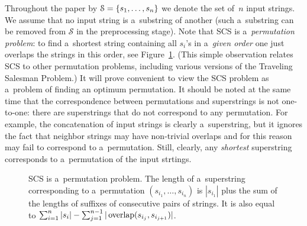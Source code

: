 Throughout the paper by ${\cal S}=\{s_1, \dots, s_n\}$ we denote
the set of~$n$ input strings. We assume that no input string is a~substring of another (such a~substring can be removed from $\mathcal{S}$ in the preprocessing stage). Note that SCS is a~{\em permutation problem}: to find a~shortest string containing all $s_i$'s in a~{\em given order} one just
overlaps the strings in this order, see Figure~\ref{fig:permutation}. (This simple observation relates SCS to other permutation problems, including various versions of the Traveling Salesman Problem.) It will prove convenient to view the SCS problem as a~problem of finding an optimum permutation.
It should be noted at the same time that the correspondence between permutations and superstrings is not one-to-one: there are superstrings that do not correspond to any permutation. For example, the concatenation of input strings is clearly a~superstring, but it ignores the fact that neighbor strings may have non-trivial overlaps and for this reason may fail to correspond to a~permutation. Still, clearly, any {\em shortest} superstring corresponds to a~permutation of the input strtings.


\begin{figure}[ht]
\caption{SCS is a~permutation problem. The length of a~superstring corresponding to a~permutation $(s_{i_1}, \dotsc, s_{i_n})$ is $|s_{i_1}|$ plus the sum of the lengths of suffixes of consecutive pairs of strings. It is also equal to $\sum_{i=1}^n |s_i|-\sum_{j=1}^{n-1}|\operatorname{overlap}(s_{i_j}, s_{i_{j+1}})|$.}
\label{fig:permutation}
\end{figure}


